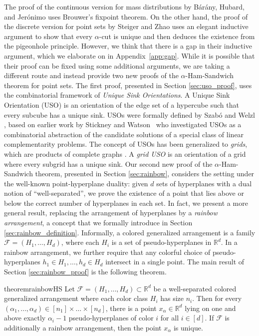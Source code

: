 \documentclass[11pt]{article}
\newcommand{\R}{\mathbb{R}}
\begin{document}
%
The proof of the continuous version for mass distributions by B\'{a}r\'{a}ny, Hubard, and Jer\'{o}nimo \cite{baranySlicingConvexSets2008} uses Brouwer's fixpoint theorem. On the other hand, the proof of the discrete version for point sets by Steiger and Zhao \cite{steigerGeneralizedHamSandwichCuts2010} uses an elegant inductive argument to show that every $\alpha$-cut is unique and then deduces the existence from the pigeonhole principle. However, we think that there is a gap in their inductive argument, which we elaborate on in Appendix~\ref{app:gap}. While it is possible that their proof can be fixed using some additional arguments, we are taking a different route and instead provide two new proofs of the $\alpha$-Ham-Sandwich theorem for point sets.
%
The first proof, presented in Section \ref{sec:uso_proof}, uses the combinatorial framework of \emph{Unique Sink Orientations}.
A Unique Sink Orientation (USO) is an orientation of the edge set of a hypercube such that every subcube has a unique sink. USOs were formally defined by Szab{\'o} and Welzl \cite{szabo2001usos}, based on earlier work by Stickney and Watson~\cite{stickney1978digraph} who investigated USOs as a combinatorial abstraction of the candidate solutions of a special class of linear complementarity problems.
The concept of USOs has been generalized to \emph{grids}, which are products of complete graphs \cite{gaertner2008grids}. A \emph{grid USO} is an orientation of a grid where every subgrid has a unique sink.
%
%
Our second new proof of the $\alpha$-Ham-Sandwich theorem, presented in Section \ref{sec:rainbow}, considers the setting under the well-known point-hyperplane duality: given $d$ sets of hyperplanes with a dual notion of ``well-separated'', we prove the existence of a point that lies above or below the correct number of hyperplanes in each set. In fact, we present a more general result, replacing the arrangement of hyperplanes by a \emph{rainbow arrangement}, a concept that we formally introduce in Section \ref{sec:rainbow_definition}. Informally, a colored generalized arrangement is a family $\mathcal{F}=(H_1, \ldots, H_d)$, where each $H_i$ is a set of pseudo-hyperplanes in $\R^d$. In a rainbow arrangement, we further require that any colorful choice of pseudo-hyperplanes $h_1\in H_1,\ldots,h_d\in H_d$ intersect in a single point. The main result of Section \ref{sec:rainbow_proof} is the following theorem.
%
\begin{restatable}{theorem}{rainbowHS}\label{thm:rainbowHS}
Let $\mathcal{F}=(H_1, \ldots,H_d)\subset\R^d$ be a well-separated colored generalized arrangement where each color class $H_i$ has size $n_i$. Then for every $(\alpha_1, \dots, \alpha_d) \in [n_1] \times \dots \times [n_d]$, there is a point $x_{\alpha} \in \mathbb{R}^d$ lying on one and above exactly $\alpha_i - 1$ pseudo-hyperplanes of color $i$ for all $i \in [d]$.
If $\mathcal{F}$ is additionally a rainbow arrangement, then the point $x_\alpha$ is unique.
\end{restatable}
\end{document}
